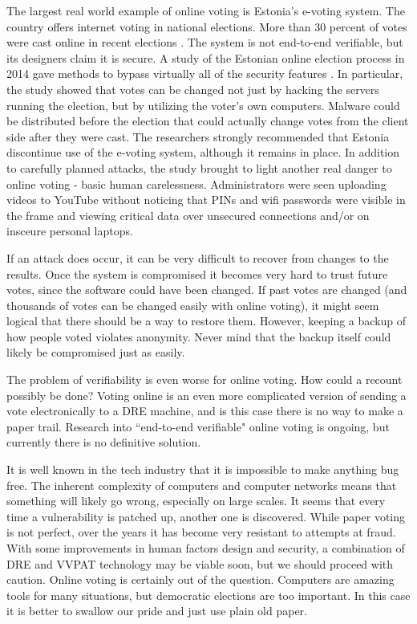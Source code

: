 \documentclass[12pt, titlepage]{article}
\begin{document}
The largest real world example of online voting is Estonia's e-voting system. The country offers internet voting in national elections. More than 30 percent of votes were cast online in recent elections \cite{hao2016real}. The system is not end-to-end verifiable, but its designers claim it is secure. A study of the Estonian online election process in 2014 gave methods to bypass virtually all of the security features \cite{springall2014security}. In particular, the study showed that votes can be changed not just by hacking the servers running the election, but by utilizing the voter's own computers. Malware could be distributed before the election that could actually change votes from the client side after they were cast. The researchers strongly recommended that Estonia discontinue use of the e-voting system, although it remains in place. In addition to carefully planned attacks, the study brought to light another real danger to online voting - basic human carelessness. Administrators were seen uploading videos to YouTube without noticing that PINs and wifi passwords were visible in the frame and viewing critical data over unsecured connections and/or on insceure personal laptops.

If an attack does occur, it can be very difficult to recover from changes to the results. Once the system is compromised it becomes very hard to trust future votes, since the software could have been changed. If past votes are changed (and thousands of votes can be changed easily with online voting), it might seem logical that there should be a way to restore them. However, keeping a backup of how people voted violates anonymity. Never mind that the backup itself could likely be compromised just as easily.

The problem of verifiability is even worse for online voting. How could a recount possibly be done? Voting online is an even more complicated version of sending a vote electronically to a DRE machine, and is this case there is no way to make a paper trail. Research into ``end-to-end verifiable" online voting is ongoing, but currently there is no definitive solution.

It is well known in the tech industry that it is impossible to make anything bug free. The inherent complexity of computers and computer networks means that something will likely go wrong, especially on large scales. It seems that every time a vulnerability is patched up, another one is discovered. While paper voting is not perfect, over the years it has become very resistant to attempts at fraud. With some improvements in human factors design and security, a combination of DRE and VVPAT technology may be viable soon, but we should proceed with caution. Online voting is certainly out of the question. Computers are amazing tools for many situations, but democratic elections are too important. In this case it is better to swallow our pride and just use plain old paper.

\newpage
\printbibliography
\end{document}
